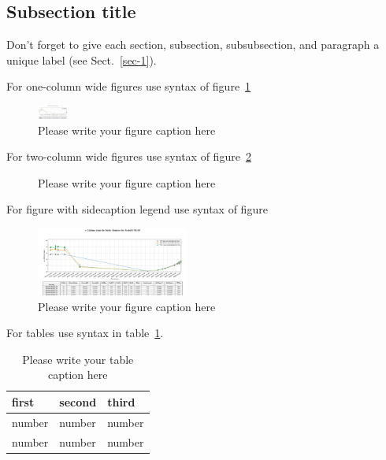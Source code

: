 \documentclass{webofc}
\begin{document}
\subsection{Subsection title}
\label{sec-2}
Don't forget to give each section, subsection, subsubsection, and
paragraph a unique label (see Sect.~\ref{sec-1}).

For one-column wide figures use syntax of figure~\ref{fig-1}
\begin{figure}[h]
\centering
\includegraphics[width=1cm,clip]{figures/dqm_purmon_20190910_1.png}
\caption{Please write your figure caption here}
\label{fig-1}       %
\end{figure}

For two-column wide figures use syntax of figure~\ref{fig-2}
\begin{figure}
\centering
\vspace*{5cm}       %
\caption{Please write your figure caption here}
\label{fig-2}       %
\end{figure}

For figure with sidecaption legend use syntax of figure
\begin{figure}
\centering
\sidecaption
\includegraphics[width=5cm,clip]{figures/dqm_purmon_20190910_1.png}
\caption{Please write your figure caption here}
\label{fig-3}       %
\end{figure}

For tables use syntax in table~\ref{tab-1}.
\begin{table}
\centering
\caption{Please write your table caption here}
\label{tab-1}       %
\begin{tabular}{lll}
\hline
first & second & third  \\\hline
number & number & number \\
number & number & number \\\hline
\end{tabular}
\vspace*{5cm}  %
\end{table}
\end{document}
